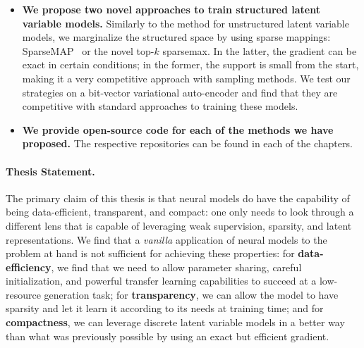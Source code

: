 \begin{itemize}
    \item \textbf{We propose two novel approaches to train structured latent variable models.}
          Similarly to the method for unstructured latent variable models, we marginalize
          the structured space by using sparse mappings: SparseMAP~\citep{sparsemap} or the novel top-$k$
          sparsemax. In the latter, the gradient can be exact in certain conditions; in the former,
          the support is small from the start, making it a very competitive approach with sampling methods.
          We test our strategies on a bit-vector variational auto-encoder and find that
          they are competitive with standard approaches to training these models.

    \item \textbf{We provide open-source code for each of the
              methods we have proposed.}
          The respective repositories can be found in each
          of the chapters.


\end{itemize}

\paragraph*{Thesis Statement.} The primary claim of this thesis is
that neural
models do have the capability of being data-efficient, transparent, and
compact: one only needs to look through a different lens that is
capable of leveraging weak supervision, sparsity, and latent
representations. We find that a \textit{vanilla}
application of neural models to the problem at hand is not sufficient
for achieving these properties: for \textbf{data-efficiency}, we find that we need
to allow parameter sharing, careful initialization, and powerful
transfer learning capabilities to succeed at a low-resource
generation task; for \textbf{transparency}, we can allow the model to have
sparsity and let it learn it according to its needs at training time; and
for \textbf{compactness}, we can leverage discrete latent variable models in a
better way than what was previously possible by using an exact but
efficient gradient.
